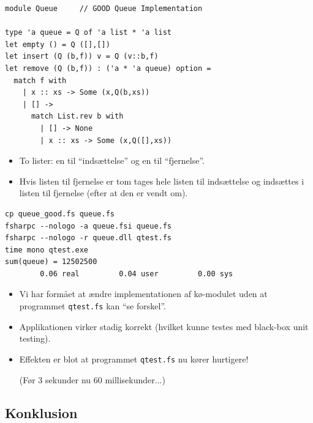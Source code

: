 \documentclass[rgb]{beamer}
\begin{document}
\begin{frame}[fragile]
\begin{footnotesize}


  \vspace{1ex}

\begin{lstlisting}[numbers=none,frame=none,mathescape]
module Queue     // GOOD Queue Implementation

type 'a queue = Q of 'a list * 'a list
let empty () = Q ([],[])
let insert (Q (b,f)) v = Q (v::b,f)
let remove (Q (b,f)) : ('a * 'a queue) option =
  match f with
    | x :: xs -> Some (x,Q(b,xs))
    | [] ->
      match List.rev b with
        | [] -> None
        | x :: xs -> Some (x,Q([],xs))
\end{lstlisting}

  \vspace{1ex}
\begin{itemize}
\item To lister: en til ``indsættelse'' og en til ``fjernelse''.
\item Hvis listen til fjernelse er tom tages hele listen til
  indsættelse og indsættes i listen til fjernelse (efter at den er
  vendt om).
\end{itemize}

\end{footnotesize}
\end{frame}

\begin{frame}[fragile]
\begin{footnotesize}

  \vspace{1ex}

\begin{verbatim}
cp queue_good.fs queue.fs
fsharpc --nologo -a queue.fsi queue.fs
fsharpc --nologo -r queue.dll qtest.fs
time mono qtest.exe
sum(queue) = 12502500
        0.06 real         0.04 user         0.00 sys
\end{verbatim}

  \vspace{1ex}
\begin{itemize}
\item Vi har formået at ændre implementationen af kø-modulet uden at programmet \texttt{qtest.fs} kan ``se forskel''.
\item Applikationen virker stadig korrekt (hvilket kunne testes med black-box unit testing).
\item Effekten er blot at programmet \texttt{qtest.fs} nu kører hurtigere!

  (Før 3 sekunder nu 60 millisekunder...)
\end{itemize}

\end{footnotesize}
\end{frame}

\subsection*{Konklusion}
\begin{frame}[fragile]

  \vspace{3mm}
  \tableofcontents
\end{frame}
\end{document}
